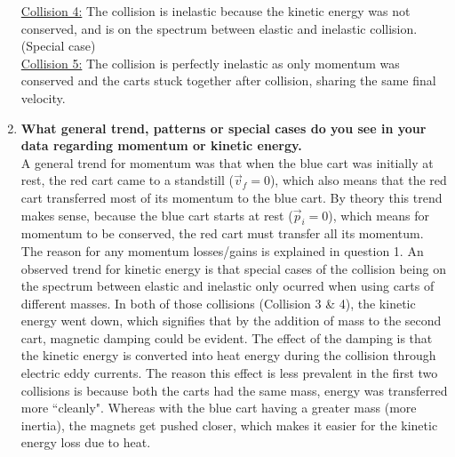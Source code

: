 \documentclass[12pt,letterpaper]{article}
\begin{document}
\begin{enumerate}
	      \underline{Collision 4:} The collision is inelastic because the kinetic energy was not conserved, and is on the spectrum between elastic and inelastic collision. (Special case) \\
	      \underline{Collision 5:} The collision is perfectly inelastic as only momentum was conserved and the carts stuck together after collision, sharing the same final velocity.
	\item \textbf{What general trend, patterns or special cases do you see in your data regarding momentum or kinetic energy.}\\
	      A general trend for momentum was that when the blue cart was initially at rest, the red cart came to a standstill ($\vec{v}_{f} = 0$), which also means that the red cart transferred most of its momentum to the blue cart.
	      By theory this trend makes sense, because the blue cart starts at rest ($\vec{p}_{i} = 0$), which means for momentum to be conserved, the red cart must transfer all its momentum.
	      The reason for any momentum losses/gains is explained in question 1.
	      An observed trend for kinetic energy is that special cases of the collision being on the spectrum between elastic and inelastic only ocurred when using carts of different masses.
	      In both of those collisions (Collision 3 \& 4), the kinetic energy went down, which signifies that by the addition of mass to the second cart, magnetic damping could be evident.
	      The effect of the damping is that the kinetic energy is converted into heat energy during the collision through electric eddy currents.
	      The reason this effect is less prevalent in the first two collisions is because both the carts had the same mass, energy was transferred more ``cleanly".
	      Whereas with the blue cart having a greater mass (more inertia), the magnets get pushed closer, which makes it easier for the kinetic energy loss due to heat.
\end{enumerate}
\end{document}
